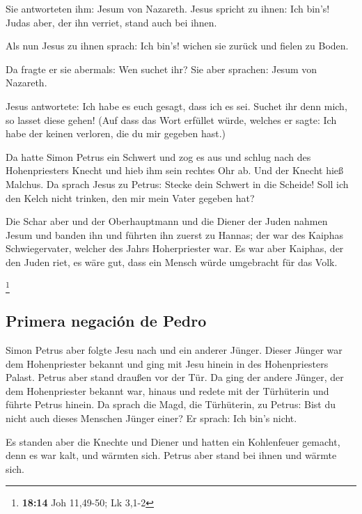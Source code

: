  Sie antworteten ihm: Jesum von Nazareth. Jesus spricht zu
ihnen: Ich bin's! Judas aber, der ihn verriet, stand auch bei ihnen.

 Als nun Jesus zu ihnen sprach: Ich bin's! wichen sie
zurück und fielen zu Boden.

 Da fragte er sie abermals: Wen suchet ihr? Sie aber
sprachen: Jesum von Nazareth.

 Jesus antwortete: Ich habe es euch gesagt, dass ich es
sei. Suchet ihr denn mich, so lasset diese gehen!  (Auf
dass das Wort erfüllet würde, welches er sagte: Ich habe der keinen
verloren, die du mir gegeben hast.)

 Da hatte Simon Petrus ein Schwert und zog es aus und
schlug nach des Hohenpriesters Knecht und hieb ihm sein rechtes Ohr ab.
Und der Knecht hieß Malchus.  Da sprach Jesus zu Petrus:
Stecke dein Schwert in die Scheide! Soll ich den Kelch nicht trinken,
den mir mein Vater gegeben hat?

 Die Schar aber und der Oberhauptmann und die Diener der
Juden nahmen Jesum und banden ihn  und führten ihn zuerst
zu Hannas; der war des Kaiphas Schwiegervater, welcher des Jahrs
Hoherpriester war.  Es war aber Kaiphas, der den Juden
riet, es wäre gut, dass ein Mensch würde umgebracht für das Volk.

\footnote{\textbf{18:14} Joh 11,49-50; Lk 3,1-2}

\hypertarget{primera-negaciuxf3n-de-pedro}{%
\subsection{Primera negación de
Pedro}\label{primera-negaciuxf3n-de-pedro}}

 Simon Petrus aber folgte Jesu nach und ein anderer
Jünger. Dieser Jünger war dem Hohenpriester bekannt und ging mit Jesu
hinein in des Hohenpriesters Palast.  Petrus aber stand
draußen vor der Tür. Da ging der andere Jünger, der dem Hohenpriester
bekannt war, hinaus und redete mit der Türhüterin und führte Petrus
hinein.  Da sprach die Magd, die Türhüterin, zu Petrus:
Bist du nicht auch dieses Menschen Jünger einer? Er sprach: Ich bin's
nicht.

 Es standen aber die Knechte und Diener und hatten ein
Kohlenfeuer gemacht, denn es war kalt, und wärmten sich. Petrus aber
stand bei ihnen und wärmte sich.

